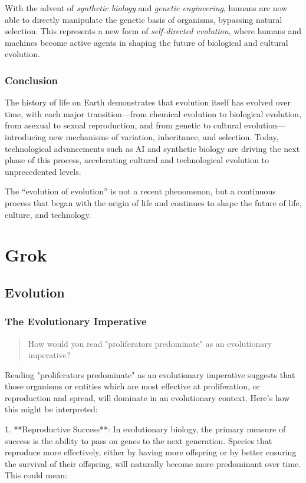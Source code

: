 \documentclass[12pt,titlepage]{book}
\begin{document}
With the advent of \textit{synthetic biology} and \textit{genetic engineering}, humans are now able to directly manipulate the genetic basis of organisms, bypassing natural selection. This represents a new form of \textit{self-directed evolution}, where humans and machines become active agents in shaping the future of biological and cultural evolution.

\section{Conclusion}

The history of life on Earth demonstrates that evolution itself has evolved over time, with each major transition—from chemical evolution to biological evolution, from asexual to sexual reproduction, and from genetic to cultural evolution—introducing new mechanisms of variation, inheritance, and selection. Today, technological advancements such as AI and synthetic biology are driving the next phase of this process, accelerating cultural and technological evolution to unprecedented levels.

The ``evolution of evolution'' is not a recent phenomenon, but a continuous process that began with the origin of life and continues to shape the future of life, culture, and technology.


\part{Grok}

\chapter{Evolution}

\section{The Evolutionary Imperative}
\begin{quote}How would you read "proliferators predominate" as an evolutionary imperative?
\end{quote}


Reading "proliferators predominate" as an evolutionary imperative suggests that those organisms or entities which are most effective at proliferation, or reproduction and spread, will dominate in an evolutionary context. Here's how this might be interpreted:

1. **Reproductive Success**: In evolutionary biology, the primary measure of success is the ability to pass on genes to the next generation. Species that reproduce more effectively, either by having more offspring or by better ensuring the survival of their offspring, will naturally become more predominant over time. This could mean:
\end{document}
